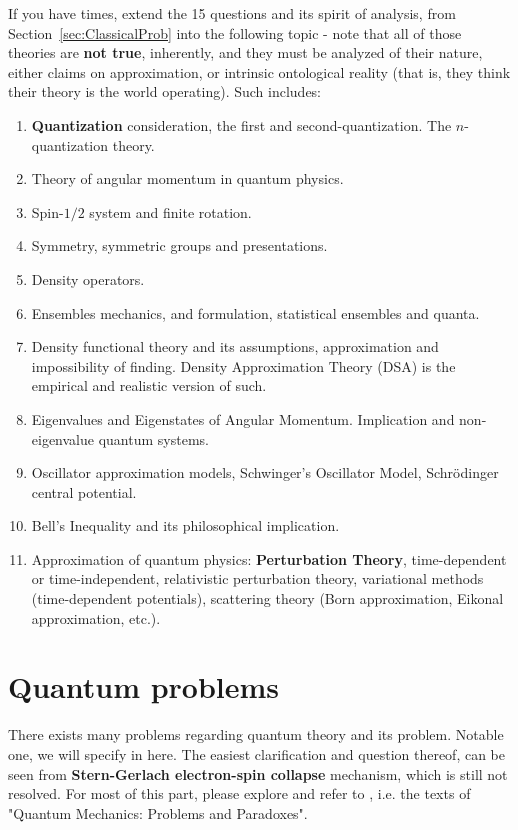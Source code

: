 \documentclass[10pt]{article}
\begin{document}
If you have times, extend the 15 questions and its spirit of analysis, from Section~\ref{sec:ClassicalProb} into the following topic - note that all of those theories are \textbf{not true}, inherently, and they must be analyzed of their nature, either claims on approximation, or intrinsic ontological reality (that is, they think their theory is the world operating). Such includes: 
\begin{enumerate}[itemsep=1pt,topsep=1pt]
  \item \textbf{Quantization} consideration, the first and second-quantization. The $n$-quantization theory. 
  \item Theory of angular momentum in quantum physics. 
  \item Spin-$1/2$ system and finite rotation. 
  \item Symmetry, symmetric groups and presentations. 
  \item Density operators. 
  \item Ensembles mechanics, and formulation, statistical ensembles and quanta. 
  \item Density functional theory and its assumptions, approximation and impossibility of finding. Density Approximation Theory (DSA) is the empirical and realistic version of such. 
  \item Eigenvalues and Eigenstates of Angular Momentum. Implication and non-eigenvalue quantum systems. 
  \item Oscillator approximation models, Schwinger's Oscillator Model, Schrödinger central potential. 
  \item Bell's Inequality and its philosophical implication. 
  \item Approximation of quantum physics: \textbf{Perturbation Theory}, time-dependent or time-independent, relativistic perturbation theory, variational methods (time-dependent potentials), scattering theory (Born approximation, Eikonal approximation, etc.). 
\end{enumerate}

\section{Quantum problems}

There exists many problems regarding quantum theory and its problem. Notable one, we will specify in here. The easiest clarification and question thereof, can be seen from \textbf{Stern-Gerlach electron-spin collapse} mechanism, which is still not resolved. For most of this part, please explore and refer to \cite{prokhorov2026quantummechanicsproblemsparadoxes}, i.e. the texts of "Quantum Mechanics: Problems and Paradoxes". 
\end{document}
